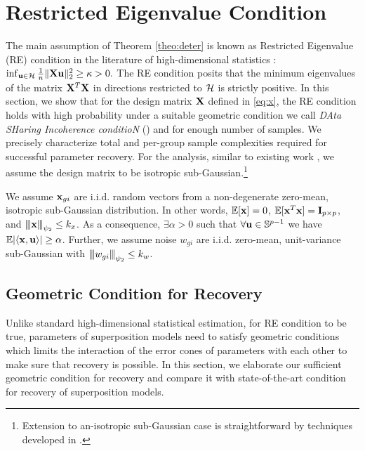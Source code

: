 \section{Restricted Eigenvalue Condition}
\label{sec:re}
The main assumption of Theorem \ref{theo:deter} is known as Restricted Eigenvalue (RE) condition in the literature of high-dimensional statistics \cite{banerjee14, nrwy12, raskutti10}:
$\inf_{\u \in \cH} \frac{1}{n} \norm{\X \u}{2}^2 \geq \kappa > 0.$
The RE condition posits that the minimum eigenvalues of the matrix $\mathbf{X}^T \mathbf{X}$ in directions restricted to $\cH$ is strictly positive.
In this section, we show that for the design matrix $\mathbf{X}$ defined in \eqref{eq:x}, the RE condition holds with high probability under a suitable geometric condition we call {\em DAta SHaring Incoherence conditioN} (\ds) and for enough number of samples.
We precisely characterize total and per-group sample complexities required for successful parameter recovery.
For the analysis, similar to existing work \cite{guba16, mend15, trop15}, we assume the design matrix to be isotropic sub-Gaussian.\footnote{Extension to an-isotropic sub-Gaussian case is straightforward by techniques developed in \cite{banerjee14, ruzh13}.}
\begin{definition}
	\label{def:obs}
	We assume $\mathbf{x}_{gi}$ are i.i.d. random vectors from a non-degenerate zero-mean, isotropic sub-Gaussian distribution. In other words, $\mathbb{E} [\mathbf{x}] = 0$, $\mathbb{E} [\mathbf{x}^T \mathbf{x}] = \mathbf{I}_{p \times p}$, and ${\left\vert\kern-0.25ex\left\vert\kern-0.25ex\left\vert \mathbf{x} \right\vert\kern-0.25ex\right\vert\kern-0.25ex\right\vert}_{\psi_2} \leq k_x$.	
As a consequence, $\exists \alpha > 0$ such that $\forall \mathbf{u} \in \mathbb S^{p-1}$ we have $ \mathbb{E}|\langle \mathbf{x}, \mathbf{u} \rangle| \geq \alpha$. Further, we assume noise $w_{gi} $ are i.i.d.
zero-mean, unit-variance sub-Gaussian with ${\left\vert\kern-0.25ex\left\vert\kern-0.25ex\left\vert w_{gi} \right\vert\kern-0.25ex\right\vert\kern-0.25ex\right\vert}_{\psi_2} \leq k_w$.
\end{definition}

\subsection{Geometric Condition for Recovery}
Unlike standard high-dimensional statistical estimation, for RE condition to be true, parameters of superposition models need to satisfy geometric conditions which limits the interaction of the error cones of parameters with each other to make sure that recovery is possible. In this section, we elaborate our sufficient geometric condition for recovery and compare it with state-of-the-art condition for recovery of superposition models. 

